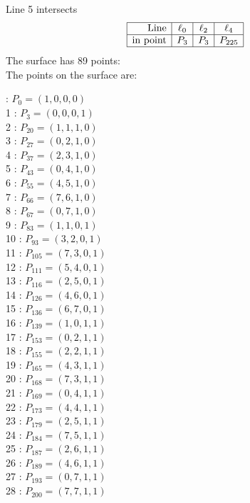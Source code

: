 \documentclass{article}
\begin{document}
{$$$$
Line 5 intersects 
$$
\begin{array}{|r*{3}{|c}|}
\hline
\mbox{Line}  & \ell_{0} & \ell_{2} & \ell_{4}\\
\hline
\mbox{in point}  & P_{3} & P_{3} & P_{225}\\
\hline
\end{array}
$$
The surface has 89 points:\\
The points on the surface are:\\
\begin{multicols}{3}
 : $P_{0}=( 1, 0, 0, 0 )$\\
1 : $P_{3}=( 0, 0, 0, 1 )$\\
2 : $P_{20}=( 1, 1, 1, 0 )$\\
3 : $P_{27}=( 0, 2, 1, 0 )$\\
4 : $P_{37}=( 2, 3, 1, 0 )$\\
5 : $P_{43}=( 0, 4, 1, 0 )$\\
6 : $P_{55}=( 4, 5, 1, 0 )$\\
7 : $P_{66}=( 7, 6, 1, 0 )$\\
8 : $P_{67}=( 0, 7, 1, 0 )$\\
9 : $P_{83}=( 1, 1, 0, 1 )$\\
10 : $P_{93}=( 3, 2, 0, 1 )$\\
11 : $P_{105}=( 7, 3, 0, 1 )$\\
12 : $P_{111}=( 5, 4, 0, 1 )$\\
13 : $P_{116}=( 2, 5, 0, 1 )$\\
14 : $P_{126}=( 4, 6, 0, 1 )$\\
15 : $P_{136}=( 6, 7, 0, 1 )$\\
16 : $P_{139}=( 1, 0, 1, 1 )$\\
17 : $P_{153}=( 0, 2, 1, 1 )$\\
18 : $P_{155}=( 2, 2, 1, 1 )$\\
19 : $P_{165}=( 4, 3, 1, 1 )$\\
20 : $P_{168}=( 7, 3, 1, 1 )$\\
21 : $P_{169}=( 0, 4, 1, 1 )$\\
22 : $P_{173}=( 4, 4, 1, 1 )$\\
23 : $P_{179}=( 2, 5, 1, 1 )$\\
24 : $P_{184}=( 7, 5, 1, 1 )$\\
25 : $P_{187}=( 2, 6, 1, 1 )$\\
26 : $P_{189}=( 4, 6, 1, 1 )$\\
27 : $P_{193}=( 0, 7, 1, 1 )$\\
28 : $P_{200}=( 7, 7, 1, 1 )$\\

\end{multicols}}
\end{document}
